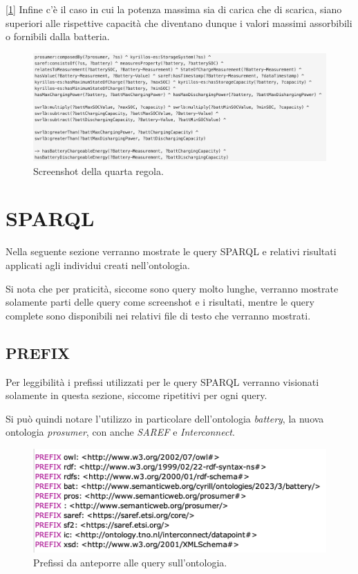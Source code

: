 [\ref*{fig:bothgreater}] Infine c'è il caso in cui la potenza massima sia di carica che di scarica, siano superiori alle rispettive capacità che diventano dunque i valori massimi assorbibili o fornibili dalla batteria.

\begin{figure}[H]
    \centering
    \includegraphics[width=15cm]{images/both >.png}
    \caption{Screenshot della quarta regola.}
    \label{fig:bothgreater}
\end{figure}

\section{SPARQL}
Nella seguente sezione verranno mostrate le query SPARQL e relativi risultati applicati agli individui creati nell'ontologia.

Si nota che per praticità, siccome sono query molto lunghe, verranno mostrate solamente parti delle query come screenshot e i risultati, mentre le query complete sono disponibili nei relativi file di testo che verranno mostrati.


\subsection{PREFIX}
Per leggibilità i prefissi utilizzati per le query SPARQL verranno visionati solamente in questa sezione, siccome ripetitivi per ogni query.

Si può quindi notare l'utilizzo in particolare dell'ontologia \textit{battery}, la nuova ontologia \textit{prosumer}, con anche \textit{SAREF} e \textit{Interconnect}.

\begin{figure}[H]
    \centering
    \includegraphics[width=15cm]{images/prefissi.png}
    \caption{Prefissi da anteporre alle query sull'ontologia.}
    \label{fig:prefix}
\end{figure}

